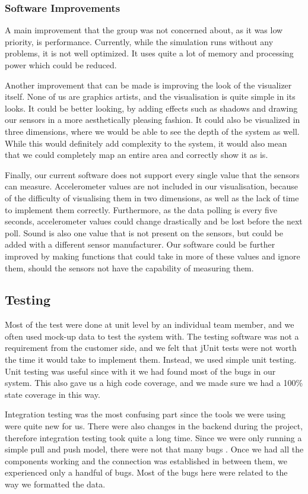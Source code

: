\documentclass[../document]{subfiles}
\begin{document}
\subsubsection{Software Improvements}
A main improvement that the group was not concerned about, as it was low priority, is performance. Currently, while the simulation runs without any problems, it is not well optimized. It uses quite a lot of memory and processing power which could be reduced.

Another improvement that can be made is improving the look of the visualizer itself. None of us are graphics artists, and the visualisation is quite simple in its looks. It could be better looking, by adding effects such as shadows and drawing our sensors in a more aesthetically pleasing fashion. It could also be visualized in three dimensions, where we would be able to see the depth of the system as well. While this would definitely add complexity to the system, it would also mean that we could completely map an entire area and correctly show it as is.

Finally, our current software does not support every single value that the sensors can measure. Accelerometer values are not included in our visualisation, because of the difficulty of visualising them in two dimensions, as well as the lack of time to implement them correctly. Furthermore, as the data polling is every five seconds, accelerometer values could change drastically and be lost before the next poll. Sound is also one value that is not present on the sensors, but could be added with a different sensor manufacturer. Our software could be further improved by making functions that could take in more of these values and ignore them, should the sensors not have the capability of measuring them.

\subsection{Testing}
Most of the test were done at unit level by an individual team member, and we often used mock-up data to test the system with. The testing software was not a requirement from the customer side, and we felt that jUnit tests were not worth the time it would take to implement them. Instead, we used simple unit testing. Unit testing was useful since with it we had found most of the bugs in our system. This also gave us a high code coverage, and we made sure we had a 100\% state coverage in this way.

Integration testing was the most confusing part since the tools we were using were quite new for us. There were also changes in the backend during the project, therefore integration testing took quite a long time. Since we were only running a simple pull and push model, there were not that many bugs . Once we had all the components working and the connection was established in between them, we experienced only a handful of bugs. Most of the bugs here were related to the way we formatted the data.
\end{document}
